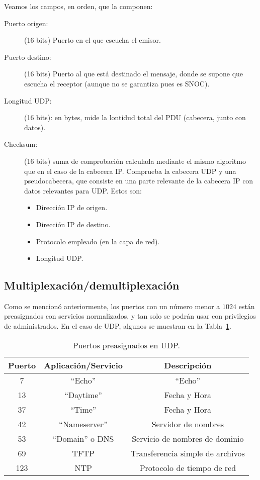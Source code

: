 Veamos los campos, en orden, que la componen:
\begin{description}
    \item [Puerto origen:] (16 bits) Puerto en el que escucha el emisor.
    \item [Puerto destino:] (16 bits) Puerto al que está destinado el mensaje, donde se supone que escucha el receptor (aunque no se garantiza pues es \acrshort{SNOC}).
    \item [Longitud \acrshort{UDP}:] (16 bits): en bytes, mide la lontidud total del \acrshort{PDU} (cabecera, junto con datos).
    \item [Checksum:] (16 bits) suma de comprobación calculada mediante el mismo algoritmo que en el caso de la cabecera \acrshort{IP}. Comprueba la cabecera \acrshort{UDP} y una pseudocabecera, que consiste en una parte relevante de la cabecera \acrshort{IP} con datos relevantes para \acrshort{UDP}. Estos son:
        \begin{itemize}
            \item Dirección IP de origen.
            \item Dirección IP de destino.
            \item Protocolo empleado (en la capa de red).
            \item Longitud UDP.
        \end{itemize}
\end{description}

\subsection{Multiplexación/demultiplexación}

Como se mencionó anteriormente, los puertos con un número menor a $1024$ están preasignados con servicios normalizados, y tan solo se podrán usar con privilegios de administrados. En el caso de \acrshort{UDP}, algunos se muestran en la Tabla~\ref{tab:puertos-udp}.
\begin{table}
    \centering
    \begin{tabular}{|c|c|c|}
        \hline Puerto & Aplicación/Servicio & Descripción\\\hline
        7 & ``Echo'' & ``Echo''\\
        13 & ``Daytime'' & Fecha y Hora\\
        37 & ``Time'' & Fecha y Hora\\
        42 & ``Nameserver'' & Servidor de nombres\\
        53 & ``Domain'' o \acrshort{DNS}  & Servicio de nombres de dominio\\
        69 & \acrshort{TFTP} & Transferencia simple de archivos\\
        123 & \acrshort{NTP} & Protocolo de tiempo de red\\\hline
    \end{tabular}
    \caption{Puertos preasignados en \acrshort{UDP}.}
    \label{tab:puertos-udp}
\end{table}

